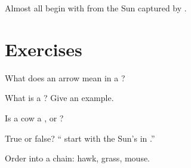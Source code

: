 \begin{proposition}\label{prop:g3:food-chains:sun}
Almost all  begin with  from the Sun captured by
.
\end{proposition}
\admitted

\section{Exercises}

\begin{exercise}[$\star$]\label{exo:g3:food-chains:1}
What does an arrow mean in a ?
\end{exercise}

\begin{exercise}[$\star$]\label{exo:g3:food-chains:2}
What is a ? Give an example.
\end{exercise}

\begin{exercise}[$\star$]\label{exo:g3:food-chains:3}
Is a cow a ,  or ?
\end{exercise}

\begin{exercise}[$\star$]\label{exo:g3:food-chains:4}
True or false? `` start with the Sun's  in
.''
\end{exercise}

\begin{exercise}[$\star\star$]\label{exo:g3:food-chains:5}
Order into a chain: hawk, grass, mouse.
\end{exercise}


